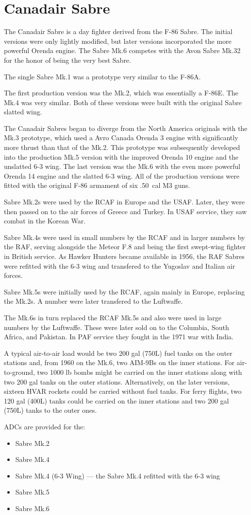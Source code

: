 \section*{Canadair Sabre}

The Canadair Sabre is a day fighter derived from the F-86 Sabre. The initial versions were only lightly modified, but later versions incorporated the more powerful Orenda engine. The Sabre Mk.6 competes with the Avon Sabre Mk.32  for the honor of being the very best Sabre.

The single Sabre Mk.1 was a prototype very similar to the F-86A. 

The first production version was the Mk.2, which was essentially a F-86E. The Mk.4 was very similar. Both of these versions were built with the original Sabre slatted wing.

The Canadair Sabres began to diverge from the North America originals with the Mk.3 prototype, which used a Avro Canada Orenda 3 engine with significantly more thrust than that of the Mk.2. This prototype was subsequently developed into the production Mk.5 version with the improved Orenda 10 engine and the unslatted 6-3 wing. The last version was the Mk.6 with the even more powerful Orenda 14 engine and the slatted 6-3 wing. All of the production versions were fitted with the original F-86 armament of six .50~cal M3 guns.

Sabre Mk.2s were used by the RCAF in Europe and the USAF. Later, they were then passed on to the air forces of Greece and Turkey. In USAF service, they saw combat in the Korean War.

Sabre Mk.4s were used in small numbers by the RCAF and in larger numbers by the RAF, serving alongside the Meteor F.8 and being the first swept-wing fighter in British service. As Hawker Hunters became available in 1956, the RAF Sabres were refitted with the 6-3 wing and transfered to the Yugoslav and Italian air forces.

Sabre Mk.5s were initially used by the RCAF, again mainly in Europe, replacing the Mk.2s. A number were later transfered to the Luftwaffe.

The Mk.6s in turn replaced the RCAF Mk.5s and also were used in large numbers by the Luftwaffe. These were later sold on to the Columbia, South Africa, and Pakistan. In PAF service they fought in the 1971 war with India.

A typical air-to-air load would be two 200 gal (750L) fuel tanks on the outer stations and, from 1960 on the Mk.6, two AIM-9Bs on the inner stations. For air-to-ground, two 1000 lb bombs might be carried on the inner stations along with two 200 gal tanks on the outer stations. Alternatively, on the later versions, sixteen HVAR rockets could be carried without fuel tanks. For ferry flights, two 120 gal (400L) tanks could be carried on the inner stations and two 200 gal (750L) tanks to the outer ones.

ADCs are provided for the:
\begin{itemize}
\item Sabre Mk.2
\item Sabre Mk.4
\item Sabre Mk.4 (6-3 Wing) --- the Sabre Mk.4 refitted with the 6-3 wing
\item Sabre Mk.5
\item Sabre Mk.6
\end{itemize}
